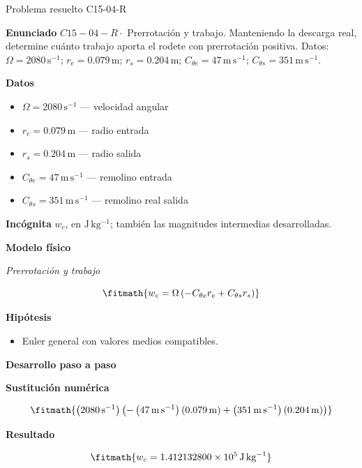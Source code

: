 \documentclass[10pt,openany]{book}
\begin{document}
\begin{studiumworked}{Problema resuelto C15-04-R}


\noindent\textbf{Enunciado}
\(C15-04-R \cdot\) Prerrotación y trabajo. Manteniendo la descarga real, determine cuánto trabajo aporta el rodete con prerrotación positiva. Datos: \(\Omega=2080\, \mathrm{s}^{-1}\); \(r_e=0.079\, \mathrm{m}\); \(r_s=0.204\, \mathrm{m}\); \(C_{\theta e}=47\, \mathrm{m}\,\mathrm{s}^{-1}\); \(C_{\theta s}=351\, \mathrm{m}\,\mathrm{s}^{-1}\).

\noindent\textbf{Datos}
\begin{itemize}
\item $\Omega = 2080\,\mathrm{s}^{-1}$ — velocidad angular
\item $r_e = 0.079\,\mathrm{m}$ — radio entrada
\item $r_s = 0.204\,\mathrm{m}$ — radio salida
\item $C_{\theta e} = 47\,\mathrm{m}\,\mathrm{s}^{-1}$ — remolino entrada
\item $C_{\theta s} = 351\,\mathrm{m}\,\mathrm{s}^{-1}$ — remolino real salida
\end{itemize}

\noindent\textbf{Incógnita}
$w_c$, en $\mathrm{J\,kg^{-1}}$; también las magnitudes intermedias desarrolladas.

\noindent\textbf{Modelo físico}

\noindent\textit{Prerrotación y trabajo}

\[
\fitmath{w_c=\Omega \left(- C_{\theta e} r_e + C_{\theta s} r_s\right)}
\]

\noindent\textbf{Hipótesis}
\begin{itemize}
\item Euler general con valores medios compatibles.
\end{itemize}

\noindent\textbf{Desarrollo paso a paso}



\noindent\textbf{Sustitución numérica}

\[
\fitmath{\left(2080\,\mathrm{s}^{-1}\right) \left(- \left(47\,\mathrm{m}\,\mathrm{s}^{-1}\right) \left(0.079\,\mathrm{m}\right) + \left(351\,\mathrm{m}\,\mathrm{s}^{-1}\right) \left(0.204\,\mathrm{m}\right)\right)}
\]

\noindent\textbf{Resultado}

\[
\fitmath{w_c=1.412132800\times10^{5}\,\mathrm{J}\,\mathrm{kg}^{-1}}
\]


\end{studiumworked}
\end{document}
